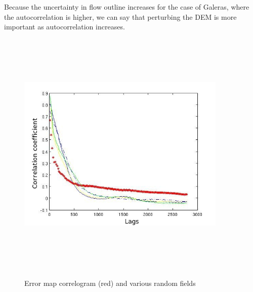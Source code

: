 \documentclass[12pt]{article}
\newcommand{\Pic}[2][0.85]{\begin{center}\texttt{[image: \#2]}
 \end{center} }
\begin{document}
Because the uncertainty in flow outline increases for the case of
Galeras, where the autocorrelation is higher, we can say that
perturbing the DEM is more important as autocorrelation increases.


	
		

\begin{figure}[H]
\centering
	\includegraphics[width=10cm,height=12cm,keepaspectratio]{figs/mammoth_error_correl.jpg}\\       
\caption{ Error map correlogram (red) and various random fields}
\label{fig1}  
\end{figure}
\end{document}
